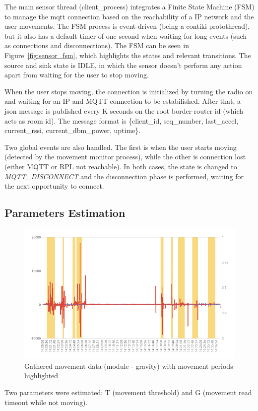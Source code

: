 \documentclass[a4paper, 10pt]{article}
\begin{document}
The main sensor thread (client\_process) integrates a Finite State Machine (FSM) to manage the mqtt connection based on the reachability of a IP network and the user movements.
The FSM process is event-driven (being a contiki protothread), but it also has a default timer of one second when waiting for long events (such as connections and disconnections).
The FSM can be seen in Figure~\ref{fig:sensor_fsm}, which highlights the states and relevant transitions.
The source and sink state is IDLE, in which the sensor doesn't perform any action apart from waiting for the user to stop moving.

When the user stops moving, the connection is initialized by turning the radio on and waiting for an IP and MQTT connection to be estabilished. 
After that, a json message is published every K seconds on the root border-router id (which acts as room id).
The message format is \{client\_id, seq\_number, last\_accel, current\_rssi, current\_dbm\_power, uptime\}.

Two global events are also handled. The first is when the user starts moving (detected by the movement monitor process), while the other is connection lost (either MQTT or RPL not reachable). In both cases, the state is changed to \emph{MQTT\_DISCONNECT} and the disconnection phase is performed, waiting for the next opportunity to connect.

\subsection*{Parameters Estimation}

\begin{figure}[h]
\centering
    \includegraphics[width=0.7\linewidth]{images/accel_chart.png}
    \caption{Gathered movement data (module - gravity) with movement periods highlighted}
    \label{fig:accel_data}
\end{figure}

Two parameters were estimated: T (movement threshold) and G (movement read timeout while not moving).
\end{document}

